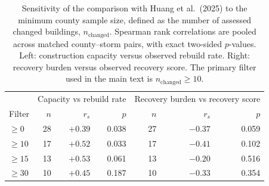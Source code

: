 \begin{table}[htb!]
\centering
\caption{Sensitivity of the comparison with Huang et al.\ (2025) to the
minimum county sample size, defined as the number of assessed changed
buildings, $n_{\mathrm{changed}}$. Spearman rank correlations are pooled
across matched county--storm pairs, with exact two-sided $p$-values.
Left: construction capacity versus observed rebuild rate. Right: recovery
burden versus observed recovery score. The primary filter used in the
main text is $n_{\mathrm{changed}} \geq 10$.}
\label{tab:huang_thresholds}
\begin{tabular}{lrrrrrr}
\hline
 & \multicolumn{3}{c}{Capacity vs rebuild rate} & \multicolumn{3}{c}{Recovery burden vs recovery score} \\
Filter & $n$ & $r_s$ & $p$ & $n$ & $r_s$ & $p$ \\
\hline
$\geq 0$ & 28 & $+0.39$ & 0.038 & 27 & $-0.37$ & 0.059 \\
$\geq 10$ & 17 & $+0.52$ & 0.033 & 17 & $-0.41$ & 0.102 \\
$\geq 15$ & 13 & $+0.53$ & 0.061 & 13 & $-0.20$ & 0.516 \\
$\geq 30$ & 10 & $+0.45$ & 0.187 & 10 & $-0.33$ & 0.354 \\
\hline
\end{tabular}
\end{table}
